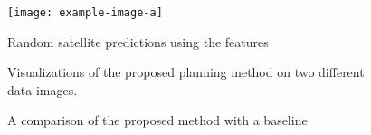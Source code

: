 \begin{figure}
    \centering
    \texttt{[image: example-image-a]}
    \caption{Random satellite predictions using the features}
    \label{fig:sat_predictions}
\end{figure}


\begin{figure}[h]
    \hfill
    \caption{Visualizations of the proposed planning method on two different data images.}
    \label{fig:res_unpairqual}
\end{figure}


\begin{figure}[h]
    \hfill
    \caption{A comparison of the proposed method with a baseline}
    \label{fig:res_pairedqual}
\end{figure}

